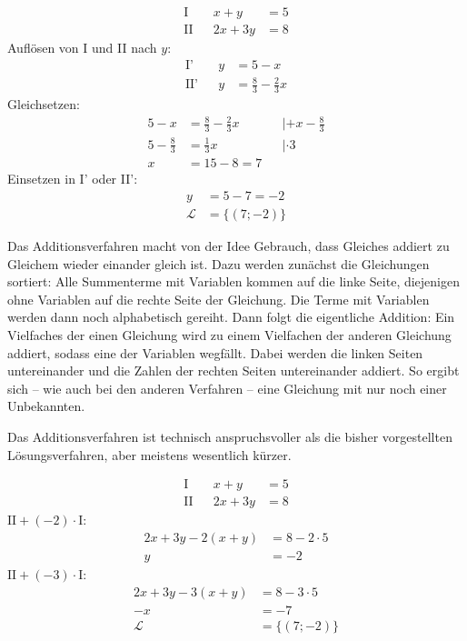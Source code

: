 \begin{bsp}[Gleichsetzungsverfahren]
 \begin{align*}
  \text{I}&& x+y &= 5\\
  \text{II}&& 2x+3y &= 8
 \end{align*}
 Auflösen von I und II nach \(y\):
 \begin{align*}
  \text{I'}&& y &= 5-x\\
  \text{II'}&& y &= \frac{8}{3}-\frac{2}{3}x
 \end{align*}
 Gleichsetzen:
 \begin{align*}
  5-x &= \frac{8}{3}-\frac{2}{3}x &&|+x -\frac{8}{3} \\
  5-\frac{8}{3} &= \frac{1}{3}x &&|\cdot 3\\
  x&= 15-8 =7
 \end{align*}
 Einsetzen in I' oder II':
 \begin{align*}
  y&=5-7 =-2\\
  \mathcal{L}&=\lbrace(7;-2)\rbrace
 \end{align*}
\end{bsp}

\begin{regel}[Additionsverfahren]
 Das Additionsverfahren macht von der Idee Gebrauch, dass Gleiches addiert zu Gleichem wieder einander gleich ist. Dazu werden zunächst die Gleichungen sortiert: Alle Summenterme mit Variablen kommen auf die linke Seite, diejenigen ohne Variablen auf die rechte Seite der Gleichung. Die Terme mit Variablen werden dann noch alphabetisch gereiht. Dann folgt die eigentliche Addition: Ein Vielfaches der einen Gleichung wird zu einem Vielfachen der anderen Gleichung addiert, sodass eine der Variablen wegfällt. Dabei werden die linken Seiten untereinander und die Zahlen der rechten Seiten untereinander addiert. So ergibt sich -- wie auch bei den anderen Verfahren -- eine Gleichung mit nur noch einer Unbekannten.
 
 Das Additionsverfahren ist technisch anspruchsvoller als die bisher vorgestellten Lösungsverfahren, aber meistens wesentlich kürzer.
\end{regel}
 
 \begin{bsp}[Additionsverfahren]
  \begin{align*}
  \text{I}&& x+y &= 5\\
  \text{II}&& 2x+3y &= 8
 \end{align*}
 \(\text{II}+(-2)\cdot \text{I}\):
 \begin{align*}
  2x+3y -2(x+y) &= 8-2\cdot 5 \\
  y &= -2
 \end{align*}
 \(\text{II}+(-3)\cdot \text{I}\):
 \begin{align*}
  2x+3y -3(x+y) &= 8-3\cdot 5 \\
  -x &= -7\\
  \mathcal{L}&=\lbrace(7;-2)\rbrace
 \end{align*}
 \end{bsp}


